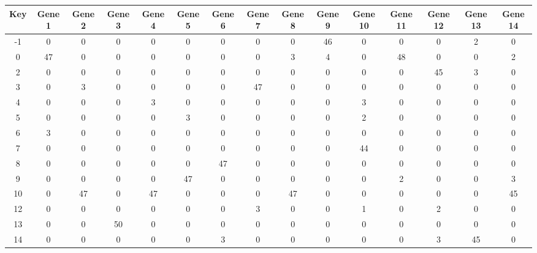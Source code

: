 \begin{tabular}{|c|c|c|c|c|c|c|c|c|c|c|c|c|c|c|}
\hline
Key & Gene 1 & Gene 2 & Gene 3 & Gene 4 & Gene 5 & Gene 6 & Gene 7 & Gene 8 & Gene 9 & Gene 10 & Gene 11 & Gene 12 & Gene 13 & Gene 14 \\
\hline
-1 & 0 & 0 & 0 & 0 & 0 & 0 & 0 & 0 & 46 & 0 & 0 & 0 & 2 & 0 \\
0 & 47 & 0 & 0 & 0 & 0 & 0 & 0 & 3 & 4 & 0 & 48 & 0 & 0 & 2 \\
2 & 0 & 0 & 0 & 0 & 0 & 0 & 0 & 0 & 0 & 0 & 0 & 45 & 3 & 0 \\
3 & 0 & 3 & 0 & 0 & 0 & 0 & 47 & 0 & 0 & 0 & 0 & 0 & 0 & 0 \\
4 & 0 & 0 & 0 & 3 & 0 & 0 & 0 & 0 & 0 & 3 & 0 & 0 & 0 & 0 \\
5 & 0 & 0 & 0 & 0 & 3 & 0 & 0 & 0 & 0 & 2 & 0 & 0 & 0 & 0 \\
6 & 3 & 0 & 0 & 0 & 0 & 0 & 0 & 0 & 0 & 0 & 0 & 0 & 0 & 0 \\
7 & 0 & 0 & 0 & 0 & 0 & 0 & 0 & 0 & 0 & 44 & 0 & 0 & 0 & 0 \\
8 & 0 & 0 & 0 & 0 & 0 & 47 & 0 & 0 & 0 & 0 & 0 & 0 & 0 & 0 \\
9 & 0 & 0 & 0 & 0 & 47 & 0 & 0 & 0 & 0 & 0 & 2 & 0 & 0 & 3 \\
10 & 0 & 47 & 0 & 47 & 0 & 0 & 0 & 47 & 0 & 0 & 0 & 0 & 0 & 45 \\
12 & 0 & 0 & 0 & 0 & 0 & 0 & 3 & 0 & 0 & 1 & 0 & 2 & 0 & 0 \\
13 & 0 & 0 & 50 & 0 & 0 & 0 & 0 & 0 & 0 & 0 & 0 & 0 & 0 & 0 \\
14 & 0 & 0 & 0 & 0 & 0 & 3 & 0 & 0 & 0 & 0 & 0 & 3 & 45 & 0 \\
\hline
\end{tabular}